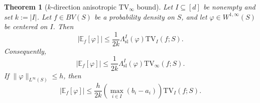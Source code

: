 \documentclass[10pt,a4paper]{amsart}
\newtheorem{theorem}{Theorem}
\newcommand{\TV}{\mathrm{TV}}
\begin{document}
\begin{theorem}[$k$-direction anisotropic $\TV_\infty$ bound]
\label{thm:k_direction_tv_bound}
Let $I\subseteq[d]$ be nonempty and set $k:=|I|$. Let $f\in BV(S)$ be a
probability density on $S$, and let $\varphi\in W^{1,\infty}(S)$ be centered on
$I$. Then
\begin{equation}
\label{eq:k_direction_tv_bound}
|\mathbb E_f[\varphi]|
\le
\frac{1}{2k}
\Lambda_{\mathrm{sl}}^I(\varphi)
\TV_I(f;S).
\end{equation}
Consequently,
\begin{equation}
\label{eq:k_direction_tv_bound_tvinfty}
|\mathbb E_f[\varphi]|
\le
\frac{1}{2k}
\Lambda_{\mathrm{sl}}^I(\varphi)
\TV_\infty(f;S).
\end{equation}
If $\|\varphi\|_{L^\infty(S)}\le h$, then
\begin{equation}
\label{eq:k_direction_tv_bound_sup}
|\mathbb E_f[\varphi]|
\le
\frac{h}{2k}
\left(\max_{i\in I}(b_i-a_i)\right)
\TV_I(f;S).
\end{equation}
\end{theorem}
\end{document}
